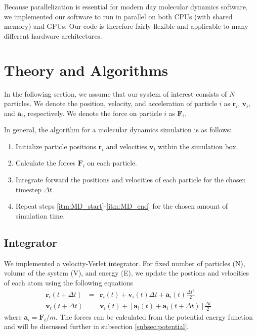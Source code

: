 \documentclass[12pt]{article}
\begin{document}
Because parallelization is essential for modern day molecular dynamics software, we implemented our software to run in parallel on both CPUs (with shared memory) and GPUs.
%
Our code is therefore fairly flexible and applicable to many different hardware architectures.

\section{Theory and Algorithms}

In the following section, we assume that our system of interest consists of $N$ particles.
%
We denote the position, velocity, and acceleration of particle $i$ as $\mathbf{r}_i$, $\mathbf{v}_i$, and $\mathbf{a}_i$, respectively. 
%
We denote the force on particle $i$ as $\mathbf{F}_i$.

In general, the algorithm for a molecular dynamics simulation is as follows:
\begin{enumerate}
\item Initialize particle positions $\mathbf{r}_i$ and velocities $\mathbf{v}_i$ within the simulation box.
\item  \label{itm:MD_start} Calculate the forces $\mathbf{F}_i$ on each particle.
\item \label{itm:MD_end} Integrate forward the positions and velocities of each particle for the chosen timestep $\Delta t$.
\item Repeat steps \ref{itm:MD_start}-\ref{itm:MD_end} for the chosen amount of simulation time.
\end{enumerate}

\subsection{Integrator} \label{subsec:integrator}

We implemented a velocity-Verlet integrator.
%
For fixed number of particles (N), volume of the system (V), and energy (E), we update the postions and velocities of each atom using the following equations
\begin{eqnarray}
\mathbf{r}_i (t + \Delta t)  & = & \mathbf{r}_i(t) + \mathbf{v}_i(t) \Delta t + \mathbf{a}_i(t) \frac{\Delta t^2}{2} \\
\mathbf{v}_i(t + \Delta t) & = & \mathbf{v}_i(t) + \left[\mathbf{a}_i(t) + \mathbf{a}_i(t + \Delta t) \right] \frac{\Delta t}{2}
\end{eqnarray}
where $\mathbf{a}_i = \mathbf{F}_i/m$.
%
The forces can be calculated from the potential energy function  and will be discussed further in subsection \ref{subsec:potential}.
\end{document}
